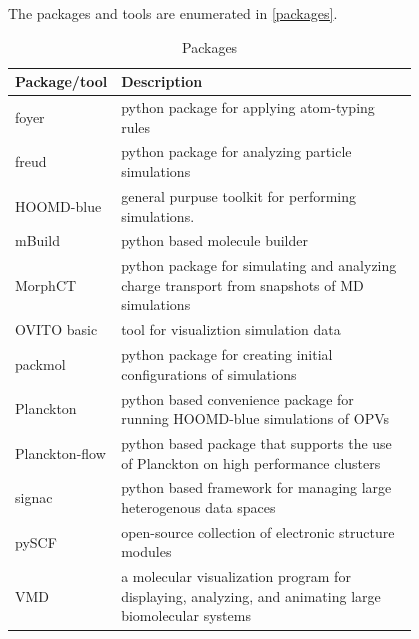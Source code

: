 The packages and tools are enumerated in \autoref{packages}.
\begin{table}[ht]
    \caption{Packages} %
\centering %
\begin{tabular}{|l|p{0.8\linewidth}|} %
\hline\hline %
Package/tool & Description \\ [0.5ex] %
\hline %
    foyer & python package for applying atom-typing rules  \cite{Klein2018a}\\ [1ex] %
freud & python package for analyzing particle simulations  \cite{Ramasubramani2020}\\ [1ex] %
HOOMD-blue & general purpuse toolkit for performing simulations.   \cite{Anderson2020a}\\ [1ex] %
    mBuild & python based molecule builder \cite{Klein2018a}\\ [1ex] %
MorphCT & python package for simulating and analyzing charge transport from 
    snapshots of MD simulations \cite{Jones2017}\cite{cmelab}\\[1ex] 
OVITO basic & tool for visualiztion simulation data \cite{Stukowski2010a}\\[1ex] 
packmol & python package for creating initial configurations of simulations \cite{Martinez2009}\\[1ex] 
Planckton & python based convenience package for running HOOMD-blue
    simulations of OPVs \cite{cmelab}\\[1ex]
Planckton-flow & python based package that supports the use of Planckton on
    high performance clusters\cite{cmelab}\\[1ex]
    signac & python based framework for managing large heterogenous data spaces \cite{Adorf2016}\\[1ex]
pySCF & open-source collection of electronic structure modules \cite{Sun2018a}\\[1ex]
VMD & a molecular visualization program for displaying, analyzing, and animating large biomolecular
    systems \cite{Humphrey1996}\\





\hline %
\end{tabular}
\label{packages} %
\end{table}


